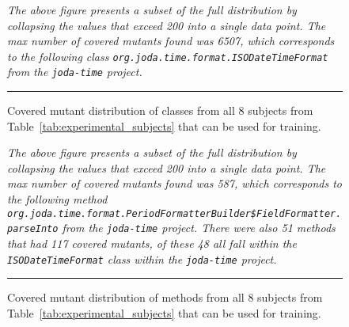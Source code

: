 \begin{figure}[!ht]
  \centering
  \caption{Covered mutant distribution of classes from all 8 subjects from Table~\ref{tab:experimental_subjects} that can be used for training.}
  \vspace{1mm}
  \footnotesize{\emph{The above figure presents a subset of the full distribution by collapsing the values that exceed 200 into a single data point. The max number of covered mutants found was 6507, which corresponds to the following class \texttt{org.joda.time.format.ISODateTimeFormat} from the \texttt{joda-time} project.}}
  \vspace{2mm}
  \hrule
  \label{fig:covered_mutant_distributions_class_all}
\end{figure}

\begin{figure}[!ht]
  \centering
  \caption{Covered mutant distribution of methods from all 8 subjects from Table~\ref{tab:experimental_subjects} that can be used for training.}
  \vspace{1mm}
  \footnotesize{\emph{The above figure presents a subset of the full distribution by collapsing the values that exceed 200 into a single data point. The max number of covered mutants found was 587, which corresponds to the following method \texttt{org.joda.time.format.PeriodFormatterBuilder\$FieldFormatter.parseInto} from the \texttt{joda-time} project. There were also 51 methods that had 117 covered mutants, of these 48 all fall within the \texttt{ISODateTimeFormat} class within the \texttt{joda-time} project.}}
  \vspace{2mm}
  \hrule
  \label{fig:covered_mutant_distributions_method_all}
\end{figure}

